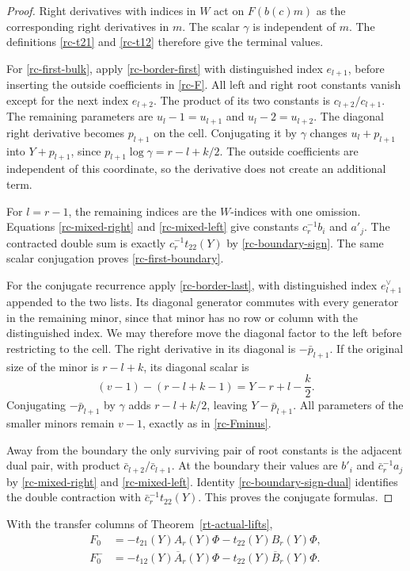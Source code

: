 \begin{proof}
Right derivatives with indices in $W$ act on
$F(b(c)m)$ as the corresponding right derivatives
in $m$.  The scalar $\gamma$ is independent of
$m$.  The definitions \eqref{rc-t21} and
\eqref{rc-t12} therefore give the terminal values.

For \eqref{rc-first-bulk}, apply
\eqref{rc-border-first} with distinguished
index $e_{l+1}$, before inserting the outside
coefficients in \eqref{rc-F}.
All left and right root constants vanish except
for the next index $e_{l+2}$.  The product of
its two constants is $c_{l+2}/c_{l+1}$.
The remaining parameters are $u_l-1=u_{l+1}$
and $u_l-2=u_{l+2}$.
The diagonal right derivative becomes $p_{l+1}$
on the cell.  Conjugating it by $\gamma$ changes
$u_l+p_{l+1}$ into $Y+p_{l+1}$, since
$p_{l+1}\log\gamma=r-l+k/2$.
The outside coefficients are independent of this
coordinate, so the derivative does not create
an additional term.

For $l=r-1$, the remaining indices are the
$W$-indices with one omission.
Equations \eqref{rc-mixed-right} and
\eqref{rc-mixed-left} give constants
$c_r^{-1}b_i$ and $a'_j$.
The contracted double sum is exactly
$c_r^{-1}t_{22}(Y)$ by
\eqref{rc-boundary-sign}.  The same scalar
conjugation proves \eqref{rc-first-boundary}.

For the conjugate recurrence apply
\eqref{rc-border-last}, with distinguished
index $e_{l+1}^\vee$ appended to the two lists.
Its diagonal generator commutes with every generator
in the remaining minor, since that minor has no row
or column with the distinguished index.  We may therefore
move the diagonal factor to the left before restricting
to the cell.
The right derivative in its diagonal is
$-\bar p_{l+1}$.
If the original size of the minor is
$r-l+k$, its diagonal scalar is
\[
       (v-1)-(r-l+k-1)=Y-r+l-\frac k2 .
\]
Conjugating $-\bar p_{l+1}$ by $\gamma$
adds $r-l+k/2$, leaving $Y-\bar p_{l+1}$.
All parameters of the smaller minors remain
$v-1$, exactly as in \eqref{rc-Fminus}.

Away from the boundary the only surviving
pair of root constants is the adjacent dual
pair, with product
$\bar c_{l+2}/\bar c_{l+1}$.
At the boundary their values are
$b'_i$ and $\bar c_r^{-1}a_j$ by
\eqref{rc-mixed-right} and
\eqref{rc-mixed-left}.
Identity \eqref{rc-boundary-sign-dual}
identifies the double contraction with
$\bar c_r^{-1}t_{22}(Y)$.
This proves the conjugate formulas.
\end{proof}

\begin{corollary}\label{rc-chain}
With the transfer columns of
Theorem~\ref{rt-actual-lifts},
\begin{align}
 F_0&=-t_{21}(Y)A_r(Y)\Phi
                              -t_{22}(Y)B_r(Y)\Phi,\label{rc-chain-plus}\\
 F_0^-&=-t_{12}(Y)\overline A_r(Y)\Phi
                              -t_{22}(Y)\overline B_r(Y)\Phi .
                                                     \label{rc-chain-minus}
\end{align}
\end{corollary}

